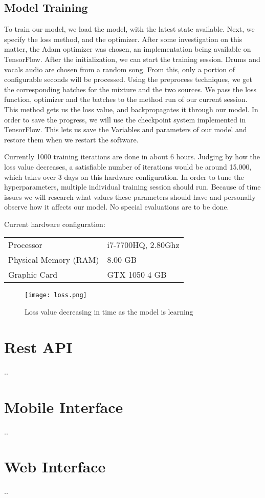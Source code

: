 \documentclass[../Thesis.tex]{subfiles}
\begin{document}
\subsection {Model Training}

To train our model, we load the model, with the latest state available. Next, we specify the loss method, and the optimizer. After some investigation on this matter, the Adam optimizer was chosen, an implementation being available on TensorFlow. After the initialization, we can start the training session.  Drums and vocals audio are chosen from a random song. From this, only a portion of configurable seconds will be processed. Using the preprocess techniques, we get the corresponding batches for the mixture and the two sources. We pass the loss function, optimizer and the batches to the method run of our current session. This method gets us the loss value, and backpropagates it through our model. In order to save the progress, we will use the checkpoint system implemented in TensorFlow. This lets us save the Variables and parameters of our model and restore them when we restart the software. 

Currently 1000 training iterations are done in about 6 hours. Judging by how the loss value decreases, a satisfiable number of iterations would be around 15.000, which takes over 3 days on this hardware configuration. In order to tune the hyperparameters, multiple individual training session should run. Because of time issues we will research what values these parameters should have and personally observe how it affects our model. No special evaluations are to be done.

\smallskip
Current hardware configuration:

\begin{tabular}{ll}
Processor & i7-7700HQ, \@ 2.80Ghz \\
Physical Memory (RAM) & 8.00 GB  \\
Graphic Card & GTX 1050 4 GB
\end{tabular}

\begin{figure}[h]
\centering
\label {fig: loss}
\texttt{[image: loss.png]}
\caption[width=0.5\textwidth]{Loss value decreasing in time as the model is learning}
\end{figure}

\section {Rest API}
..

\section {Mobile Interface}
..

\section {Web Interface}
..
\end{document}
